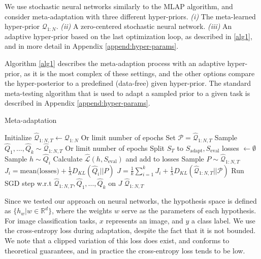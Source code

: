 \documentclass[letterpaper]{article} %
\theoremstyle{definition}
\begin{document}
We use stochastic neural networks \citep{Graves2011, Blundell2015} similarly to the MLAP \citep{Amit2018} algorithm, and consider meta-adaptation with three different hyper-priors. \emph{(i)} The meta-learned hyper-prior $\mathcal{Q}_{1:N}$. \emph{(ii)} A zero-centered stochastic neural network. \emph{(iii)}  An adaptive hyper-prior based on the last optimization loop, as described in \ref{alg1}, and in more detail in  Appendix \ref{append:hyper-params}. 

Algorithm \ref{alg1} describes the meta-adaption process with an adaptive hyper-prior, as it is the most complex of these settings, and the other options compare the hyper-posterior to a predefined (data-free) given hyper-prior. The standard meta-testing algorithm that is used to adapt a sampled prior to a given task is described in Appendix \ref{append:hyper-params}.

\begin{algorithm}[H]
	\caption{Meta-adaptation}
	\label{alg1}
	\small
	\begin{algorithmic}
		\State Initialize $\hat{\mathcal{Q}}_{1:N, T}\leftarrow \mathcal{Q}_{1:N}$
		 \Comment Or limit number of epochs
			\State Set $\mathcal{P}=\hat{\mathcal{Q}}_{1:N, T}$
			\State Sample $\hat{Q}_1,\ldots,\hat{Q}_k\sim \hat{\mathcal{Q}}_{1:N, T}$
			 \Comment Or limit number of epochs
					\State Split $S_T$ to $S_{\mathrm{adapt}},S_{\mathrm{eval}}$
					\State losses $\leftarrow \emptyset$
						\State Sample $h\sim \hat{Q}_i$
						\State Calculate $\hat{\mathcal{L}}(h,S_{\mathrm{eval}})$ and add to losses
					\EndFor 
					\State Sample $P\sim \hat{\mathcal{Q}}_{1:N, T}$
					\State $J_i=\textrm{mean(losses)}+\frac{1}{\lambda} D_{KL}(\hat{Q}_i||P)$
				\EndFor
				\State $J=\frac{1}{k}\sum_{i=1}^{k}J_i + \frac{1}{\lambda} D_{KL}(\hat{\mathcal{Q}}_{1:N, T}||\mathcal{P})$
				\State  Run SGD step w.r.t $\hat{\mathcal{Q}}_{1:N, T},\hat{Q}_1,\ldots,\hat{Q}_k$ on $J$
			\EndWhile
		\EndWhile
		\State \Return $\hat{\mathcal{Q}}_{1:N, T}$
		\EndFunction
	\end{algorithmic}
\end{algorithm}

Since we tested our approach on neural networks, the hypothesis space is defined as $\{h_w|w\in \mathbb{R}^d\}$, where the weights $w$ serve as the parameters of each hypothesis.
For image classification tasks, $x$ represents an image, and $y$ a class label. 
We use the cross-entropy loss during adaptation, despite the fact that it is not bounded. We note that a clipped variation of this loss does exist, and conforms to theoretical guarantees, and in practice the cross-entropy loss tends to be low.
\end{document}
